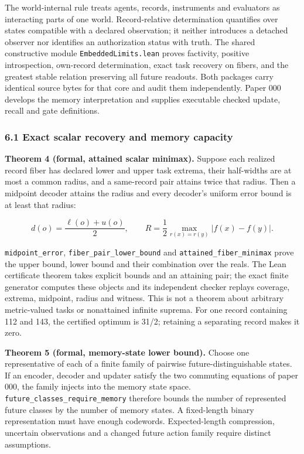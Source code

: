 \documentclass[
  10pt,
]{article}
\begin{document}
The world-internal rule treats agents, records, instruments and evaluators as interacting parts of one world. Record-relative determination quantifies over states compatible with a declared observation; it neither introduces a detached observer nor identifies an authorization status with truth. The shared constructive module \texttt{EmbeddedLimits.lean} proves factivity, positive introspection, own-record determination, exact task recovery on fibers, and the greatest stable relation preserving all future readouts. Both packages carry identical source bytes for that core and audit them independently. Paper 000 develops the memory interpretation and supplies executable checked update, recall and gate definitions.

\subsubsection{6.1 Exact scalar recovery and memory capacity}\label{exact-scalar-recovery-and-memory-capacity}

\textbf{Theorem 4 (formal, attained scalar minimax).} Suppose each realized record fiber has declared lower and upper task extrema, their half-widths are at most a common radius, and a same-record pair attains twice that radius. Then a midpoint decoder attains the radius and every decoder's uniform error bound is at least that radius:

\protect\hypertarget{math-E0047-0046}{}{\[
d(o)=\frac{\ell(o)+u(o)}2,\qquad
R=\frac12\max_{r(x)=r(y)}|f(x)-f(y)|.
\]}

\texttt{midpoint\_error}, \texttt{fiber\_pair\_lower\_bound} and \texttt{attained\_fiber\_minimax} prove the upper bound, lower bound and their combination over the reals. The Lean certificate theorem takes explicit bounds and an attaining pair; the exact finite generator computes these objects and its independent checker replays coverage, extrema, midpoint, radius and witness. This is not a theorem about arbitrary metric-valued tasks or nonattained infinite suprema. For one record containing 112 and 143, the certified optimum is 31/2; retaining a separating record makes it zero.

\textbf{Theorem 5 (formal, memory-state lower bound).} Choose one representative of each of a finite family of pairwise future-distinguishable states. If an encoder, decoder and updater satisfy the two commuting equations of paper 000, the family injects into the memory state space. \texttt{future\_classes\_require\_memory} therefore bounds the number of represented future classes by the number of memory states. A fixed-length binary representation must have enough codewords. Expected-length compression, uncertain observations and a changed future action family require distinct assumptions.
\end{document}
